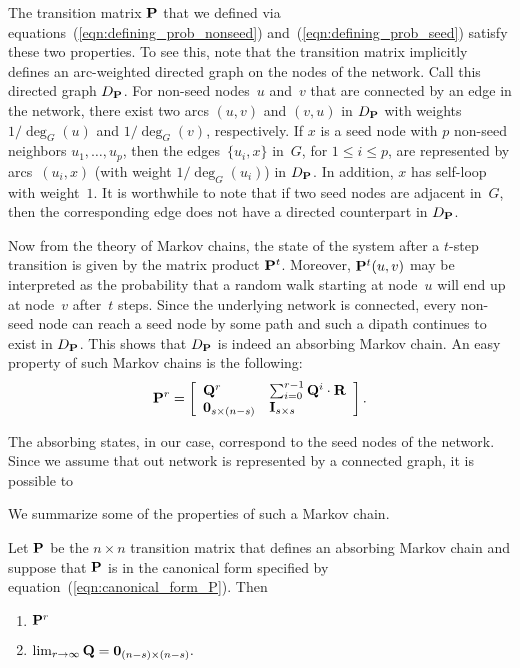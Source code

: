 The transition matrix $\mathbf{P}$ that we defined via equations~(\ref{eqn:defining_prob_nonseed}) 
and~(\ref{eqn:defining_prob_seed}) satisfy these two properties. To see this, note that 
the transition matrix implicitly defines an arc-weighted  directed graph on the nodes 
of the network. Call this directed graph $D_{\mathbf{P}}$. For non-seed nodes~$u$ and~$v$ that 
are connected by an edge in the network, there exist two arcs $(u, v)$ and $(v, u)$ 
in $D_{\mathbf{P}}$ with weights $1/\deg_{G}(u)$ and $1/\deg_{G}(v)$, respectively. If $x$ 
is a seed node with $p$ non-seed neighbors $u_1, \ldots, u_p$, then the edges~$\{u_i, x\}$ 
in~$G$, for $1 \leq i \leq p$, are represented by arcs~$(u_i, x)$ (with weight $1 /\deg_G(u_i)$) 
in $D_{\mathbf{P}}$. In addition, $x$ has self-loop with weight~$1$. It is worthwhile to note 
that if two seed nodes are adjacent in~$G$, then the corresponding edge does not have a 
directed counterpart in $D_{\mathbf{P}}$.  

Now from the theory of Markov chains, the state of the system after a $t$-step transition 
is given by the matrix product $\mathbf{P}^t$. Moreover, $\mathbf{P}^t(u, v)$ may be interpreted 
as the probability that a random walk starting at node~$u$ will end up at node~$v$ 
after~$t$ steps. Since the underlying network is connected, every non-seed node can reach a seed
node by some path and such a dipath continues to exist in $D_{\mathbf{P}}$. This shows that $D_{\mathbf{P}}$
is indeed an absorbing Markov chain. An easy property of such Markov chains is the following:
\begin{equation}\label{exp:rth_product_of_P}
	\mathbf{P}^r = \left [ \begin{array}{ll}
						\mathbf{Q}^r  					& \sum_{i = 0}^{r - 1}\mathbf{Q}^i \cdot \mathbf{R} \\
						 \mathbf{0}_{s \times (n - s)} & \mathbf{I}_{s \times s}
						\end{array}
				\right ].
\end{equation} 

The absorbing states, in our case, 
correspond to the seed nodes of the network. Since we assume that out network is represented by 
a connected graph, it is possible to 

We summarize some of the properties of such a Markov chain. 
\begin{proposition}\label{prop:limiting_Q}
	Let $\mathbf{P}$ be the $n \times n$ transition matrix that defines an absorbing Markov chain
	and suppose that $\mathbf{P}$ is in the canonical form specified by equation~(\ref{eqn:canonical_form_P}). 
	Then
	\begin{enumerate}
		\item $\mathbf{P}^{r}$ 
		\item $\lim_{r \to \infty} \mathbf{Q} = \mathbf{0}_{(n - s) \times (n - s)}.$
	\end{enumerate} 
\end{proposition}
